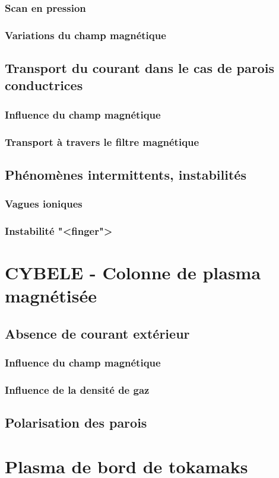 \begin{refsection}
	\subsubsection{Scan en pression}
	\subsubsection{Variations du champ magnétique}
\subsection{Transport du courant dans le cas de parois conductrices}
	\subsubsection{Influence du champ magnétique}
	\subsubsection{Transport à travers le filtre magnétique}
\subsection{Phénomènes intermittents, instabilités}
	\subsubsection{Vagues ioniques}
	\subsubsection{Instabilité "<finger">}
	
\section{CYBELE - Colonne de plasma magnétisée}
\subsection{Absence de courant extérieur}
	\subsubsection{Influence du champ magnétique}
	\subsubsection{Influence de la densité de gaz}
\subsection{Polarisation des parois}
		

\section{Plasma de bord de tokamaks}
%
%
\end{refsection}
